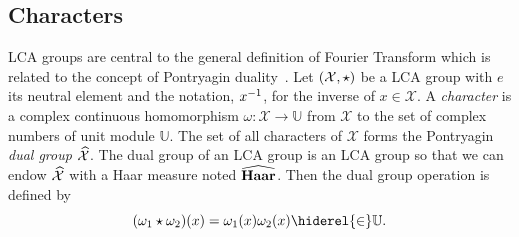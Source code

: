 \subsection{Characters}
\label{subsec:character} \acf{LCA} groups are central to the general definition
of Fourier Transform which is related to the concept of Pontryagin
duality~\citep{folland1994course}.  Let $(\mathcal{X}, \star)$ be a \ac{LCA}
group with $e$ its neutral element and the notation, ${x}^{-1}$, for the inverse
of $x \in \mathcal{X}$. A \emph{character} is a complex continuous homomorphism
$\omega:\mathcal{X}\to\mathbb{U}$ from $\mathcal{X}$ to the set of complex
numbers of unit module $\mathbb{U}$. The set of all characters of $\mathcal{X}$
forms the Pontryagin \emph{dual  group} $\widehat{\mathcal{X}}$. The dual group of
an \ac{LCA} group is an \ac{LCA} group so that we can endow
$\widehat{\mathcal{X}}$ with a  Haar measure noted $\widehat{\mathbf{Haar}}$. Then
the dual group operation is defined by
\begin{dmath*}
    (\omega_1 \groupop \omega_2)(x)=\omega_1(x)\omega_2(x) \hiderel{\in}
    \mathbb{U}.
\end{dmath*}
